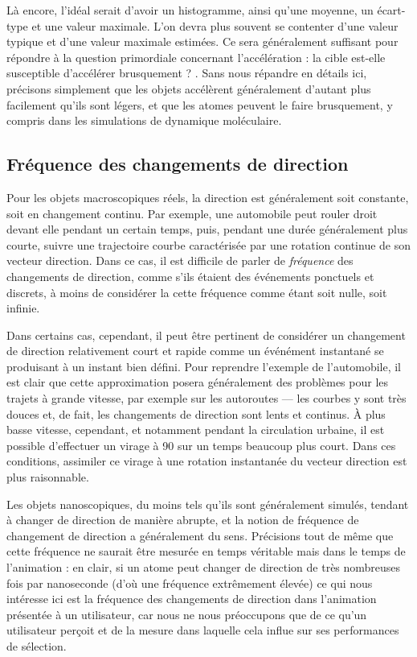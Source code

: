 	Là encore, l'idéal serait d'avoir un histogramme, ainsi qu'une moyenne, un écart-type et une valeur maximale. L'on devra plus souvent se contenter d'une valeur typique et d'une valeur maximale estimées. Ce sera généralement suffisant pour répondre à la question primordiale concernant l'accélération : \og la cible est-elle susceptible d'accélérer brusquement ? \fg{}. Sans nous répandre en détails ici, précisons simplement que les objets accélèrent généralement d'autant plus facilement qu'ils sont légers, et que les atomes peuvent le faire brusquement, y compris dans les simulations de dynamique moléculaire.
   
    \subsection{Fréquence des changements de direction}
    Pour les objets macroscopiques réels, la direction est généralement soit constante, soit en changement continu. Par exemple, une automobile peut rouler droit devant elle pendant un certain temps, puis, pendant une durée généralement plus courte, suivre une trajectoire courbe caractérisée par une rotation continue de son vecteur direction. Dans ce cas, il est difficile de parler de \emph{fréquence} des changements de direction, comme s'ils étaient des événements ponctuels et discrets, à moins de considérer la cette fréquence comme étant soit nulle, soit infinie.
    
    Dans certains cas, cependant, il peut être pertinent de considérer un changement de direction relativement court et rapide comme un événément instantané se produisant à un instant bien défini. Pour reprendre l'exemple de l'automobile, il est clair que cette approximation posera généralement des problèmes pour les trajets à grande vitesse, par exemple sur les autoroutes --- les courbes y sont très douces et, de fait, les changements de direction sont lents et continus. À plus basse vitesse, cependant, et notamment pendant la circulation urbaine, il est possible d'effectuer un virage à 90\textdegree{} sur un temps beaucoup plus court. Dans ces conditions, assimiler ce virage à une rotation instantanée du vecteur direction est plus raisonnable.
    
    Les objets nanoscopiques, du moins tels qu'ils sont généralement simulés, tendant à changer de direction de manière abrupte, et la notion de fréquence de changement de direction a généralement du sens. Précisions tout de même que cette fréquence ne saurait être mesurée en temps véritable mais dans le temps de l'animation : en clair, si un atome peut changer de direction de très nombreuses fois par nanoseconde (d'où une fréquence extrêmement élevée) ce qui nous intéresse ici est la fréquence des changements de direction dans l'animation présentée à un utilisateur, car nous ne nous préoccupons que de ce qu'un utilisateur perçoit et de la mesure dans laquelle cela influe sur ses performances de sélection.
    
